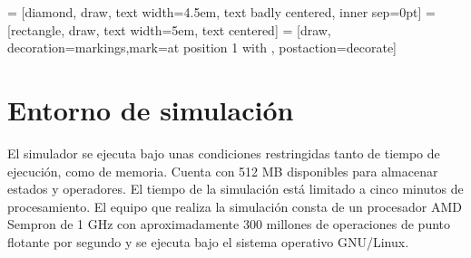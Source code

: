 \begin{center}
 = [diamond, draw, text width=4.5em, text badly centered, 
inner sep=0pt]
 = [rectangle, draw, text width=5em, text centered]
 = [draw, decoration={markings,mark=at position 
1 with {}}, postaction={decorate}]
%
\end{center}

\section{Entorno de simulación}
El simulador se ejecuta bajo unas condiciones restringidas tanto de tiempo de 
ejecución, como de memoria. Cuenta con 512 MB disponibles para almacenar estados 
y operadores. El tiempo de la simulación está limitado a cinco minutos de 
procesamiento. El equipo que realiza la simulación consta de un procesador AMD 
Sempron de 1 GHz con aproximadamente 300 millones de operaciones de punto 
flotante por segundo y se ejecuta bajo el sistema operativo GNU/Linux.

